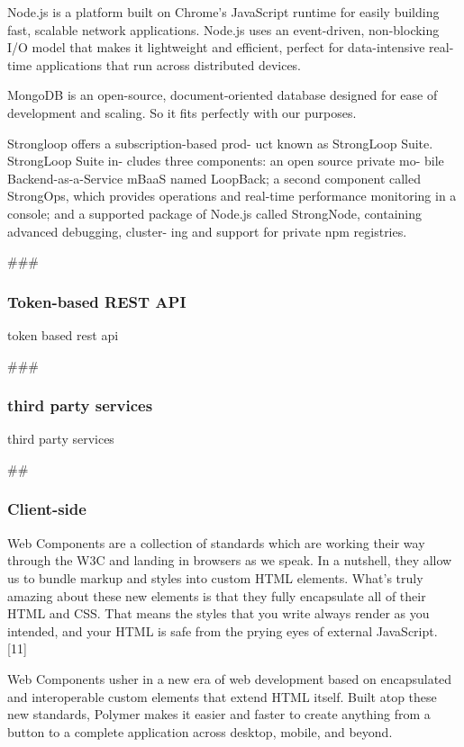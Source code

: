 \documentclass{sig-alternate}
\begin{document}
\begin{description}
\itemsep1pt\parskip0pt
\item[Node.js web framework] 
Node.js is a platform built on Chrome's JavaScript runtime for easily building fast, scalable network applications. Node.js uses an event-driven, non-blocking I/O model that makes it lightweight and efficient, perfect for data-intensive real-time applications that run across distributed devices.

\item[MongDB]
MongoDB is an open-source, document-oriented database designed for ease of development and scaling. So it fits perfectly with our purposes.

\item[Strongloop]
Strongloop offers a subscription-based prod- uct known as StrongLoop Suite. StrongLoop Suite in- cludes three components: an open source private mo- bile Backend-as-a-Service mBaaS named LoopBack; a second component called StrongOps, which provides operations and real-time performance monitoring in a console; and a supported package of Node.js called StrongNode, containing advanced debugging, cluster- ing and support for private npm registries. 
\end{description}

### \subsubsection{Token-based REST API}
token based rest api

### \subsubsection{third party services}
third party services

## \subsubsection{Client-side}

\begin{description}
\itemsep1pt\parskip0pt
       \item[Web Components] 
       Web Components are a collection of standards which are working their way through the W3C and landing in browsers as we speak. In a nutshell, they allow us to bundle markup and styles into custom HTML elements. What's truly amazing about these new elements is that they fully encapsulate all of their HTML and CSS. That means the styles that you write always render as you intended, and your HTML is safe from the prying eyes of external JavaScript. [11] 
        \item[Polymer.js]
       Web Components usher in a new era of web development based on encapsulated and interoperable custom  elements that extend HTML itself. Built atop these new standards, Polymer makes it easier and faster to create anything from a button to a complete application across desktop, mobile, and beyond. 

\end{description}
\end{document}
